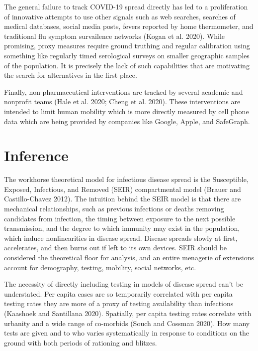\documentclass[10pt,letterpaper]{article}
\begin{document}
The general failure to track COVID-19 spread directly has led to a
proliferation of innovative attempts to use other signals such as web
searches, searches of medical databases, social media posts, fevers
reported by home thermometer, and traditional flu symptom survailence
networks (Kogan et al. 2020). While promising, proxy measures require
ground truthing and regular calibration using something like regularly
timed serological surveys on smaller geographic samples of the
population. It is precisely the lack of such capabilities that are
motivating the search for alternatives in the first place.

Finally, non-pharmaceutical interventions are tracked by several
academic and nonprofit teams (Hale et al. 2020; Cheng et al. 2020).
These interventions are intended to limit human mobility which is more
directly measured by cell phone data which are being provided by
companies like Google, Apple, and SafeGraph.

\hypertarget{inference}{%
\section{Inference}\label{inference}}

The workhorse theoretical model for infectious disease spread is the
Susceptible, Exposed, Infectious, and Removed (SEIR) compartmental model
(Brauer and Castillo-Chavez 2012). The intuition behind the SEIR model
is that there are mechanical relationships, such as previous infections
or deaths removing candidates from infection, the timing between
exposure to the next possible transmission, and the degree to which
immunity may exist in the population, which induce nonlinearities in
disease spread. Disease spreads slowly at first, accelerates, and then
burns out if left to its own devices. SEIR should be considered the
theoretical floor for analysis, and an entire menagerie of extensions
account for demography, testing, mobility, social networks, etc.

The necessity of directly including testing in models of disease spread
can't be understated. Per capita cases are so temporarily correlated
with per capita testing rates they are more of a proxy of testing
availability than infections (Kaashoek and Santillana 2020). Spatially,
per capita testing rates correlate with urbanity and a wide range of
co-morbids (Souch and Cossman 2020). How many tests are given and to who
varies systematically in response to conditions on the ground with both
periods of rationing and blitzes.
\end{document}
